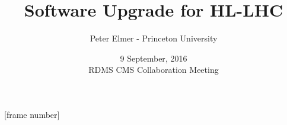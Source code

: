 \documentclass{beamer}
\title{Software Upgrade for HL-LHC}
\author{Peter Elmer - Princeton University}
\date{9 September, 2016 \\ RDMS CMS Collaboration Meeting}
\begin{document}
\maketitle

%
%

[frame number]













%
















%

%


\end{document}
